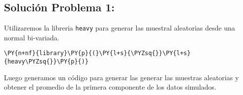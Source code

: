 \subsection*{Solución Problema 1:}
Utilizaremos la libreria \texttt{heavy} para generar las muestral aleatorias desde una normal bi-variada.
    \begin{tcolorbox}[breakable, size=fbox, boxrule=1pt, pad at break*=1mm,colback=cellbackground, colframe=cellborder]
\begin{Verbatim}[commandchars=\\\{\}]
\PY{n+nf}{library}\PY{p}{(}\PY{l+s}{\PYZsq{}}\PY{l+s}{heavy\PYZsq{}}\PY{p}{)}
\end{Verbatim}
\end{tcolorbox}
Luego generamos un código para generar las generar las muestras aleatorias y obtener el promedio de la primera componente de los datos simulados.
